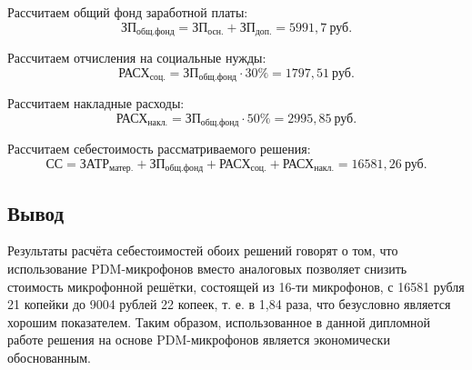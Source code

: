 Рассчитаем общий фонд заработной платы:
\begin{equation}
	\text{ЗП}_\text{общ.фонд} = \text{ЗП}_\text{осн.} + \text{ЗП}_\text{доп.} = 5991,7~\text{руб}.
\end{equation}

Рассчитаем отчисления на социальные нужды:
\begin{equation}
	\text{РАСХ}_\text{соц.} = \text{ЗП}_\text{общ.фонд} \cdot{} 30\% = 1797,51~\text{руб}.
\end{equation}

Рассчитаем накладные расходы:
\begin{equation}
	\text{РАСХ}_\text{накл.} = \text{ЗП}_\text{общ.фонд} \cdot{} 50\% = 2995,85~\text{руб}.
\end{equation}

Рассчитаем себестоимость рассматриваемого решения:
\begin{equation}
	\text{СС} = \text{ЗАТР}_\text{матер.} + \text{ЗП}_\text{общ.фонд} + \text{РАСХ}_\text{соц.} + \text{РАСХ}_\text{накл.} = 16581,26~\text{руб}.
\end{equation}

\subsection{Вывод}
Результаты расчёта себестоимостей обоих решений говорят о том, что использование PDM-микрофонов вместо аналоговых позволяет снизить стоимость микрофонной решётки, состоящей из 16-ти микрофонов, с 16581 рубля 21 копейки до 9004 рублей 22 копеек, т. е. в 1,84 раза, что безусловно является хорошим показателем. Таким образом, использованное в данной дипломной работе решения на основе PDM-микрофонов является экономически обоснованным.